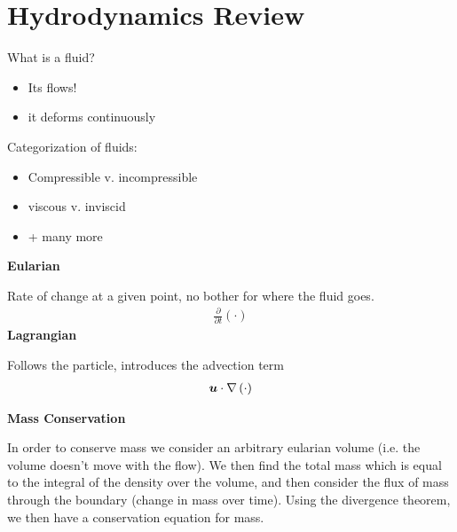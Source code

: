 \documentclass{article}
\begin{document}
\tableofcontents
\pagebreak

\setlength{\parindent}{0pt}
\setcounter{section}{1}

\section{Hydrodynamics Review}

What is a fluid?
\begin{itemize}
    \item Its flows! 
    \item it deforms continuously
\end{itemize}

Categorization of fluids:
\begin{itemize}
    \item Compressible v. incompressible
    \item viscous v. inviscid
    \item + many more
\end{itemize}

\vspace{20pt}

    \centering
    {\Large \textbf{Eularian}}
    \vspace{5pt}

    Rate of change at a given point, no bother for where the fluid goes. 
    \begin{gather*}
        \frac{\partial}{\partial t}\left(\cdot\right) 
    \end{gather*}
\emp
\hspace{5pt}
    \centering
    {\Large \textbf{Lagrangian}}
    \vspace{5pt}

    Follows the particle, introduces the advection term
    \begin{gather*}
        \boldsymbol{u}\cdot\nabla \left(\cdot\right)
    \end{gather*}
\emp

\vspace{20pt}
{\Large \textbf{Mass Conservation}}
\vspace{5pt}


In order to conserve mass we consider an arbitrary eularian volume (i.e. the
volume doesn't move with the flow). We then find the total mass which is equal
to the integral of the density over the volume, and then consider the flux of
mass through the boundary (change in mass over time). Using the divergence
theorem, we then have a conservation equation for mass. 
\end{document}
